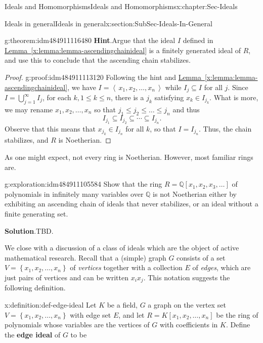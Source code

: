 \documentclass[oneside,10pt,]{book}
\newcommand{\blocktitlefont}{\relax}
\newcommand{\xreffont}{\relax}
\newcommand{\terminology}[1]{\textbf{#1}}
\numberwithin{equation}{section}
\renewcommand{\le}{\leqslant}
\newcommand{\ideal}[1]{\left\langle\, #1 \,\right\rangle}
\newcommand{\set}[1]{\left\{ {#1} \right\}}
\def\Q{{\mathbb Q}}
\begin{document}
\begin{chapterptx}{Ideals and Homomorphisms}{}{Ideals and Homomorphisms}{}{}{x:chapter:Sec-Ideals}
\begin{sectionptx}{Ideals in general}{}{Ideals in general}{}{}{x:section:SubSec-Ideals-In-General}
\begin{theorem}{}{}{g:theorem:idm484911116480}
\textbf{\blocktitlefont Hint}.\quad{}Argue that the ideal \(I\) defined in \hyperref[x:lemma:lemma-ascendingchainideal]{Lemma~{\xreffont\ref{x:lemma:lemma-ascendingchainideal}}} is a finitely generated ideal of \(R\), and use this to conclude that the ascending chain stabilizes.%
\end{theorem}
\begin{proof}{}{g:proof:idm484911113120}
Following the hint and \hyperref[x:lemma:lemma-ascendingchainideal]{Lemma~{\xreffont\ref{x:lemma:lemma-ascendingchainideal}}}, we have \(I = \ideal{x_1, x_2, \ldots, x_n}\) while \(I_j\subseteq I\) for all \(j\). Since \(I = \bigcup\limits_{j=1}^\infty I_j\), for each \(k, 1\le k \le n\), there is a \(j_k\) satisfying \(x_k \in I_{j_k}\). What is more, we may rename \(x_1, x_2, \ldots, x_n\) so that \(j_1 \le j_2 \le \ldots \le j_n\) and thus%
\begin{equation*}
I_{j_1} \subseteq I_{j_2}\subseteq \cdots \subseteq I_{j_n}.
\end{equation*}
Observe that this means that \(x_{j_k}\in I_{j_n}\) for all \(k\), so that \(I = I_{j_n}\). Thus, the chain stabilizes, and \(R\) is Noetherian.%
\end{proof}
As one might expect, not every ring is Noetherian. However, most familiar rings are.%
\begin{exploration}{}{g:exploration:idm484911105584}%
Show that the ring \(R = \Q[x_1, x_2, x_3, \ldots]\) of polynomials in infinitely many variables over \(\Q\) is not Noetherian either by exhibiting an ascending chain of ideals that never stabilizes, or an ideal without a finite generating set.%
\par\smallskip%
\noindent\textbf{\blocktitlefont Solution}.\hypertarget{g:solution:idm484911103904}{}\quad{}TBD.%
\end{exploration}
We close with a discussion of a class of ideals which are the object of active mathematical research. Recall that a (simple) graph \(G\) consists of a set \(V = \set{x_1, x_2, \ldots, x_n}\) of \emph{vertices} together with a collection \(E\) of \emph{edges}, which are just pairs of vertices and can be written \(x_i x_j\). This notation suggests the following definition.%
\begin{definition}{}{x:definition:def-edge-ideal}%
Let \(K\) be a field, \(G\) a graph on the vertex set \(V = \set{x_1, x_2, \ldots, x_n}\) with edge set \(E\), and let \(R = K[x_1, x_2, \ldots, x_n]\) be the ring of polynomials whose variables are the vertices of \(G\) with coefficients in \(K\). Define the \terminology{edge ideal} of \(G\) to be%

\end{definition}
\end{sectionptx}
\end{chapterptx}
\end{document}
